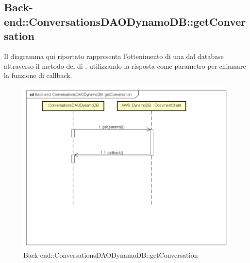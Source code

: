 \subsection{Back-end::ConversationsDAODynamoDB::getConversation}
Il diagramma qui riportato rappresenta l'ottenimento di una  dal database attraverso il metodo  del  di , utilizzando la risposta come parametro per chiamare la funzione di callback.
 \begin{figure}[h] \centering \includegraphics[width=\textwidth,height=\textheight,keepaspectratio]{images/diagrams/back-end/Ufficial_Backend/Back-endConversationsDAODynamoDBgetConversation.png} 	\caption{Back-end::ConversationsDAODynamoDB::getConversation}
\end{figure}
\newpage


